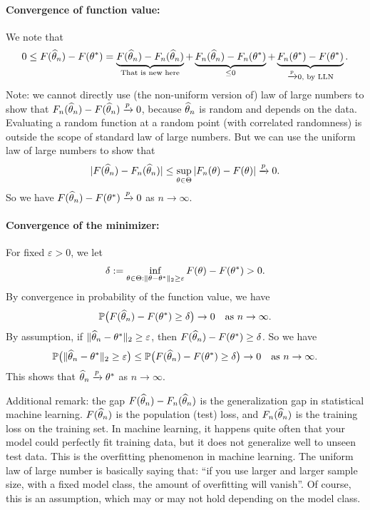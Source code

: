 \documentclass[11pt,letterpaper]{article}
\numberwithin{assumption}{lecture}
\numberwithin{theorem}{lecture}
\numberwithin{proposition}{lecture}
\numberwithin{lemma}{lecture}
\numberwithin{claim}{lecture}
\numberwithin{corollary}{lecture}
\numberwithin{definition}{lecture}
\numberwithin{conjecture}{lecture}
\numberwithin{remark}{lecture}
\numberwithin{example}{lecture}
\numberwithin{equation}{lecture}
\begin{document}
\paragraph{Convergence of function value:} We note that
\begin{align*}
  0 \leq F (\widehat{\theta}_n) - F (\theta^*) = \underbrace{F (\widehat{\theta}_n) - F_n (\widehat{\theta}_n)}_{\text{That is new here}} + \underbrace{F_n (\widehat{\theta}_n) - F_n (\theta^*)}_{ \leq 0} + \underbrace{F_n (\theta^*) - F (\theta^*)}_{\xrightarrow{p} 0, \text{ by LLN}}.
\end{align*}
Note: we {\color{red}cannot} directly use (the non-uniform version of) law of large numbers to show that $F_n (\widehat{\theta}_n) - F (\widehat{\theta}_n) \xrightarrow{p} 0$, because $\widehat{\theta}_n$ is random and depends on the data. Evaluating a random function at a random point (with correlated randomness) is outside the scope of standard law of large numbers. But we can use the uniform law of large numbers to show that
\begin{align*}
  |F (\widehat{\theta}_n) - F_n (\widehat{\theta}_n)| \leq \sup_{\theta \in \Theta} |F_n (\theta) - F(\theta)| \xrightarrow{p} 0.
\end{align*}
So we have $F (\widehat{\theta}_n) - F (\theta^*) \xrightarrow{p} 0$ as $n \to \infty$.
\paragraph{Convergence of the minimizer:} For fixed $\varepsilon > 0$, we let
\begin{align*}
  \delta := \inf_{\theta \in \Theta: \|\theta - \theta^*\|_2 \geq \varepsilon} F(\theta) - F(\theta^*) > 0.
\end{align*}
By convergence in probability of the function value, we have
\begin{align*}
  {\mathbb{P}} \big( F (\widehat{\theta}_n) - F (\theta^*) \geq \delta \big) \to 0 \quad \text{as } n \to \infty.
\end{align*}
By assumption, if $\|\widehat{\theta}_n - \theta^*\|_2 \geq \varepsilon$, then $F (\widehat{\theta}_n) - F (\theta^*) \geq \delta$. So we have
\begin{align*}
  {\mathbb{P}} \big( \|\widehat{\theta}_n - \theta^*\|_2 \geq \varepsilon \big) \leq {\mathbb{P}} \big( F (\widehat{\theta}_n) - F (\theta^*) \geq \delta \big) \to 0 \quad \text{as } n \to \infty.
\end{align*}
This shows that $\widehat{\theta}_n \xrightarrow{p} \theta^*$ as $n \to \infty$.

Additional remark: the gap $F (\widehat{\theta}_n) - F_n (\widehat{\theta}_n)$ is the generalization gap in statistical machine learning. $F (\widehat{\theta}_n)$ is the population (test) loss, and $F_n (\widehat{\theta}_n)$ is the training loss on the training set. In machine learning, it happens quite often that your model could perfectly fit training data, but it does not generalize well to unseen test data. This is the overfitting phenomenon in machine learning. The uniform law of large number is basically saying that: ``if you use larger and larger sample size, with a fixed model class, the amount of overfitting will vanish''. Of course, this is an assumption, which may or may not hold depending on the model class.
\end{document}
